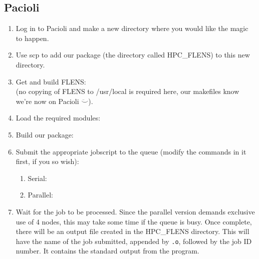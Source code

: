 \subsection{Pacioli}

\begin{enumerate}
   \item Log in to Pacioli and make a new directory where you would like the magic to happen.
   \item Use scp to add our package (the directory called HPC\_FLENS) to this new directory.
   \item Get and build FLENS: 
   \\
   (no copying of FLENS to /usr/local is required here, our makefiles know we're now on Pacioli $\ddot\smile$).
   
   \item Load the required modules:
   
   \item Build our package:
   
   \item Submit the appropriate jobscript to the queue (modify the commands in it first, if you so wish):
   
   \begin{enumerate}
   \item Serial:
   
   \item Parallel:
   
   \end{enumerate}
   
   \item Wait for the job to be processed. Since the parallel version demands exclusive use of 4 nodes, this may take some time if the queue is busy. Once complete, there will be an output file created in the HPC\_FLENS directory. This will have the name of the job submitted, appended by \texttt{.o}, followed by the job ID number. It contains the standard output from the program.
      
      
 \end{enumerate}
 
